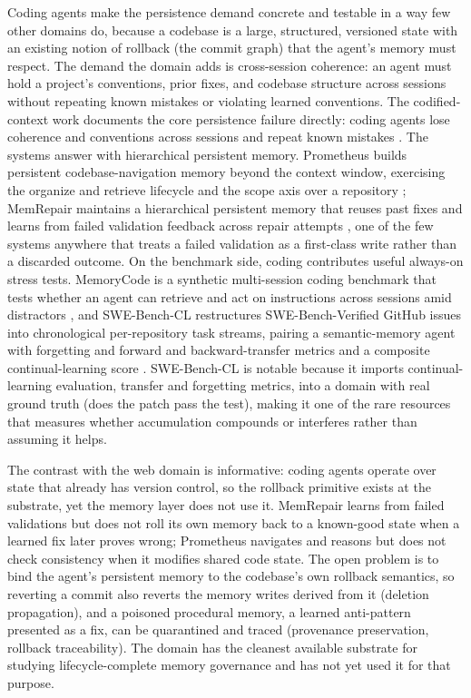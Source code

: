 Coding agents make the persistence demand concrete and testable in a way few other domains do, because a codebase is a large, structured, versioned state with an existing notion of rollback (the commit graph) that the agent's memory must respect. The demand the domain adds is cross-session coherence: an agent must hold a project's conventions, prior fixes, and codebase structure across sessions without repeating known mistakes or violating learned conventions. The codified-context work documents the core persistence failure directly: coding agents lose coherence and conventions across sessions and repeat known mistakes \citep{vasilopoulos2026codifiedcontext}. The systems answer with hierarchical persistent memory. Prometheus builds persistent codebase-navigation memory beyond the context window, exercising the organize and retrieve lifecycle and the scope axis over a repository \citep{pan2025prometheus}; MemRepair maintains a hierarchical persistent memory that reuses past fixes and learns from failed validation feedback across repair attempts \citep{liu2026memrepair}, one of the few systems anywhere that treats a failed validation as a first-class write rather than a discarded outcome. On the benchmark side, coding contributes useful always-on stress tests. MemoryCode is a synthetic multi-session coding benchmark that tests whether an agent can retrieve and act on instructions across sessions amid distractors \citep{rakotonirina2025memorycode}, and SWE-Bench-CL restructures SWE-Bench-Verified GitHub issues into chronological per-repository task streams, pairing a semantic-memory agent with forgetting and forward and backward-transfer metrics and a composite continual-learning score \citep{joshi2025swebenchcl}. SWE-Bench-CL is notable because it imports continual-learning evaluation, transfer and forgetting metrics, into a domain with real ground truth (does the patch pass the test), making it one of the rare resources that measures whether accumulation compounds or interferes rather than assuming it helps.

The contrast with the web domain is informative: coding agents operate over state that already has version control, so the rollback primitive exists at the substrate, yet the memory layer does not use it. MemRepair learns from failed validations but does not roll its own memory back to a known-good state when a learned fix later proves wrong; Prometheus navigates and reasons but does not check consistency when it modifies shared code state. The open problem is to bind the agent's persistent memory to the codebase's own rollback semantics, so reverting a commit also reverts the memory writes derived from it (deletion propagation), and a poisoned procedural memory, a learned anti-pattern presented as a fix, can be quarantined and traced (provenance preservation, rollback traceability). The domain has the cleanest available substrate for studying lifecycle-complete memory governance and has not yet used it for that purpose.


